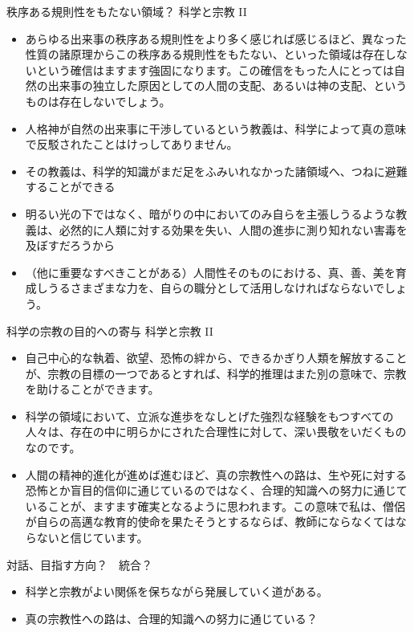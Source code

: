 \documentclass[10pt, dvipdfmx]{beamer}
\begin{document}
\begin{frame}{}
\begin{block}{秩序ある規則性をもたない領域？ \hfill 科学と宗教 II}
\begin{itemize}
\item あらゆる出来事の秩序ある規則性をより多く感じれば感じるほど、異なった性質の諸原理からこの秩序ある規則性をもたない、といった領域は存在しないという確信はますます強固になります。この確信をもった人にとっては自然の出来事の独立した原因としての人間の支配、あるいは神の支配、というものは存在しないでしょう。
\item 人格神が自然の出来事に干渉しているという教義は、科学によって真の意味で反駁されたことはけっしてありません。
\item その教義は、科学的知識がまだ足をふみいれなかった諸領域へ、つねに避難することができる
\item 明るい光の下ではなく、暗がりの中においてのみ自らを主張しうるような教義は、必然的に人類に対する効果を失い、人間の進歩に測り知れない害毒を及ぼすだろうから
\item （他に重要なすべきことがある）人間性そのものにおける、真、善、美を育成しうるさまざまな力を、自らの職分として活用しなければならないでしょう。
\end{itemize}
\end{block}


\end{frame}

\begin{frame}{}
\begin{block}{科学の宗教の目的への寄与 \hfill 科学と宗教 II}
\begin{itemize}
\item 自己中心的な執着、欲望、恐怖の絆から、できるかぎり人類を解放することが、宗教の目標の一つであるとすれば、科学的推理はまた別の意味で、宗教を助けることができます。
\item 科学の領域において、立派な進歩をなしとげた強烈な経験をもつすべての人々は、存在の中に明らかにされた合理性に対して、深い畏敬をいだくものなのです。
\item 人間の精神的進化が進めば進むほど、真の宗教性への路は、生や死に対する恐怖とか盲目的信仰に通じているのではなく、合理的知識への努力に通じていることが、ますます確実となるように思われます。この意味で私は、僧侶が自らの高邁な教育的使命を果たそうとするならば、教師にならなくてはならないと信じています。
\end{itemize}
\end{block}

\bigskip
\begin{alertblock}{対話、目指す方向？　統合？}
\begin{itemize}
\item 科学と宗教がよい関係を保ちながら発展していく道がある。
\item 真の宗教性への路は、合理的知識への努力に通じている？
\end{itemize}
\end{alertblock}

\end{frame}
\end{document}
